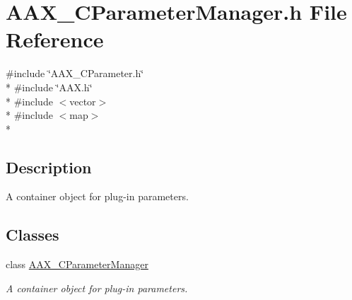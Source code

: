 \hypertarget{a00191}{}\section{A\+A\+X\+\_\+\+C\+Parameter\+Manager.\+h File Reference}
\label{a00191}
{\ttfamily \#include \char`\"{}A\+A\+X\+\_\+\+C\+Parameter.\+h\char`\"{}}\\*
{\ttfamily \#include \char`\"{}A\+A\+X.\+h\char`\"{}}\\*
{\ttfamily \#include $<$vector$>$}\\*
{\ttfamily \#include $<$map$>$}\\*


\subsection{Description}
A container object for plug-\/in parameters. 

\subsection*{Classes}
\begin{DoxyCompactItemize}
\item 
class \hyperlink{a00034}{A\+A\+X\+\_\+\+C\+Parameter\+Manager}
\begin{DoxyCompactList}\small\item\em A container object for plug-\/in parameters. \end{DoxyCompactList}\end{DoxyCompactItemize}
